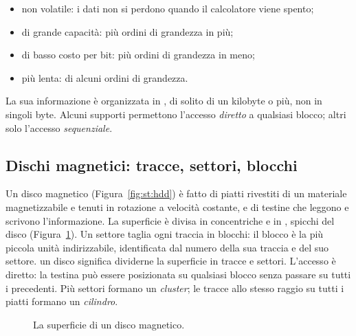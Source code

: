 \begin{itemize}
\item non volatile: i dati non si perdono quando il calcolatore viene spento;
\item di grande capacità: più ordini di grandezza in più;
\item di basso costo per bit: più ordini di grandezza in meno;
\item più lenta: di alcuni ordini di grandezza.
\end{itemize}

La sua informazione è organizzata in , di solito di un kilobyte
o più, non in singoli byte. Alcuni supporti permettono l'accesso
\emph{diretto} a qualsiasi blocco; altri solo l'accesso \emph{sequenziale}.

\subsection{Dischi magnetici: tracce, settori, blocchi}

Un disco magnetico (Figura~\ref{fig:st:hdd}) è fatto di piatti rivestiti di un
materiale magnetizzabile e tenuti in rotazione a velocità costante, e di
testine che leggono e scrivono l'informazione. La superficie è divisa in
 concentriche e in , spicchi del disco
(Figura~\ref{fig:st:disk}). Un settore taglia ogni traccia in blocchi: il
blocco è la più piccola unità indirizzabile, identificata dal numero della sua
traccia e del suo settore.  un disco significa dividerne la
superficie in tracce e settori. L'accesso è diretto: la testina può essere
posizionata su qualsiasi blocco senza passare su tutti i precedenti. Più
settori formano un \emph{cluster}; le tracce allo stesso raggio su tutti i
piatti formano un \emph{cilindro}.

\begin{figure}[htb]
\centering
{}
\caption{La superficie di un disco magnetico.}
\label{fig:st:disk}
\end{figure}

